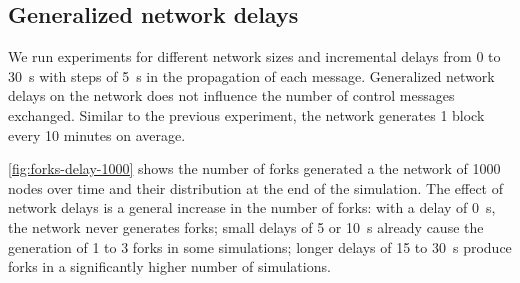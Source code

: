 \subsection{Generalized network delays}
We run experiments for different network sizes and incremental delays from \num{0} to \SI{30}{\second} with steps of \SI{5}{\second} in the propagation of each message.
Generalized network delays on the network does not influence the number of control messages exchanged.
Similar to the previous experiment, the network generates \num{1} block every \num{10} minutes on average.

\medskip
\cref{fig:forks-delay-1000} shows the number of forks generated a the network of \num{1000} nodes over time and their distribution at the end of the simulation.
The effect of network delays is a general increase in the number of forks:
with a delay of \SI{0}{\second}, the network never generates forks;
small delays of \num{5} or \SI{10}{\second} already cause the generation of \num{1} to \num{3} forks in some simulations;
longer delays of \num{15} to \SI{30}{\second} produce forks in a significantly higher number of simulations.

